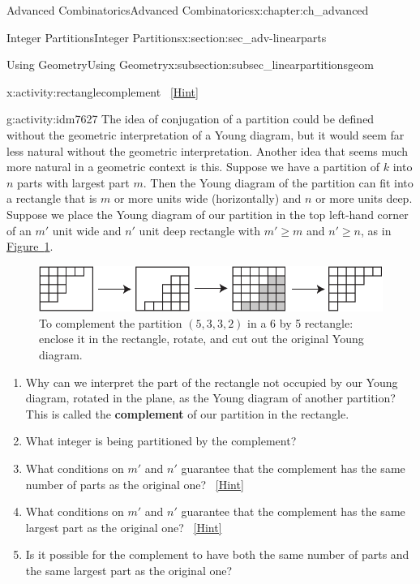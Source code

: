 \documentclass[oneside,10pt,]{book}
\newcommand{\terminology}[1]{\textbf{#1}}
\numberwithin{equation}{chapter}
\begin{document}
\begin{chapterptx}{Advanced Combinatorics}{}{Advanced Combinatorics}{}{}{x:chapter:ch_advanced}
\begin{sectionptx}{Integer Partitions}{}{Integer Partitions}{}{}{x:section:sec_adv-linearparts}
\begin{subsectionptx}{Using Geometry}{}{Using Geometry}{}{}{x:subsection:subsec_linearpartitionsgeom}
\begin{introduction}{}
\begin{activity}{}{x:activity:rectanglecomplement}
\qquad~\hfill{\tiny\hyperlink{g:hint:idm7611-back}{[Hint]}}\end{activity}
\begin{activity}{}{g:activity:idm7627}%
The idea of conjugation of a partition could be defined without the geometric interpretation of a Young diagram, but it would seem far less natural without the geometric interpretation. Another idea that seems much more natural in a geometric context is this. Suppose we have a partition of \(k\) into \(n\) parts with largest part \(m\). Then the Young diagram of the partition can fit into a rectangle that is \(m\) or more units wide (horizontally) and \(n\) or more units deep. Suppose we place the Young diagram of our partition in the top left-hand corner of an \(m'\) unit wide and \(n'\) unit deep rectangle with \(m'\ge m\) and \(n' \ge n\), as in \hyperref[x:figure:complementpartition]{Figure~\ref{x:figure:complementpartition}}.%
\begin{figure}
\centering
\includegraphics[width=0.7\linewidth]{images/complementpartition}
\caption{To complement the partition \((5,3,3,2)\) in a 6 by 5 rectangle: enclose it in the rectangle, rotate, and cut out the original Young diagram.\label{x:figure:complementpartition}}
\end{figure}
\begin{enumerate}[font=\bfseries,label=(\alph*),ref=\alph*]
\item{}Why can we interpret the part of the rectangle not occupied by our Young diagram, rotated in the plane, as the Young diagram of another partition? This is called the \terminology{complement} of our partition in the rectangle.%
\item{}What integer is being partitioned by the complement?%
\item{}What conditions on \(m'\) and \(n'\) guarantee that the complement has the same number of parts as the original one?%
\qquad~\hfill{\tiny\hyperlink{g:hint:idm7664-back}{[Hint]}}\item{}What conditions on \(m'\) and \(n'\) guarantee that the complement has the same largest part as the original one?%
\qquad~\hfill{\tiny\hyperlink{g:hint:idm7681-back}{[Hint]}}\item{}Is it possible for the complement to have both the same number of parts and the same largest part as the original one?%

\end{enumerate}
\end{activity}
\end{introduction}
\end{subsectionptx}
\end{sectionptx}
\end{chapterptx}
\end{document}
